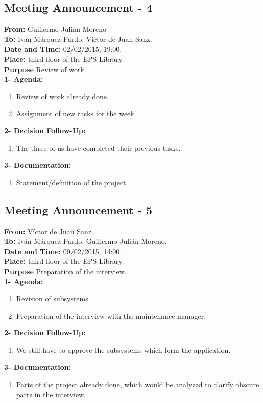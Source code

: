 \subsection{Meeting Announcement - 4}

\textbf{From: } Guillermo Julián Moreno\\
\textbf{To: } Iván Márquez Pardo, Víctor de Juan Sanz.\\

\textbf{Date and Time: } 02/02/2015, 19:00.\\
\textbf{Place: } third floor of the EPS Library.\\

\textbf{Purpose} Review of work. \\

\textbf{1- Agenda:}
\begin{enumerate}
\item Review of work already done.
\item Assignment of new tasks for the week.
\end{enumerate}
\textbf{2- Decision Follow-Up:} 
\begin{enumerate}
\item The three of us have completed their previous tasks.
\end{enumerate}
\textbf{3- Documentation:}
\begin{enumerate}
\item Statement/definition of the project.
\end{enumerate}


\subsection{Meeting Announcement - 5}

\textbf{From: } Víctor de Juan Sanz.\\
\textbf{To: } Iván Márquez Pardo, Guillermo Julián Moreno.\\

\textbf{Date and Time: } 09/02/2015, 14:00.\\
\textbf{Place: } third floor of the EPS Library.\\

\textbf{Purpose} Preparation of the interview. \\

\textbf{1- Agenda:}
\begin{enumerate}
\item Revision of subsystems.
\item Preparation of the interview with the maintenance manager.
\end{enumerate}
\textbf{2- Decision Follow-Up:} 
\begin{enumerate}
\item We still have to approve the subsystems which form the application.
\end{enumerate}
\textbf{3- Documentation:}
\begin{enumerate}
\item Parts of the project already done, which would be analyzed to clarify obscure parts in the interview.
\end{enumerate}

